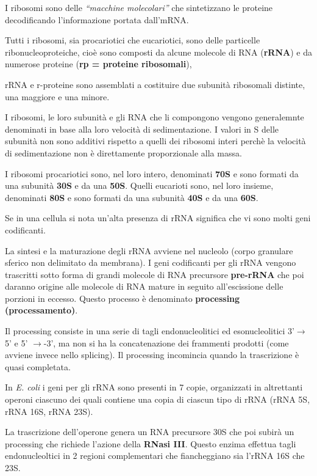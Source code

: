 \documentclass[]{article}
\begin{document}
I ribosomi sono delle \emph{``macchine molecolari''} che sintetizzano le
proteine decodificando l'informazione portata dall'mRNA.

Tutti i ribosomi, sia procariotici che eucariotici, sono delle
particelle ribonucleoproteiche, cioè sono composti da alcune molecole di
RNA (\textbf{rRNA}) e da numerose proteine (\textbf{rp = proteine
ribosomali}),

rRNA e r-proteine sono assemblati a costituire due subunità ribosomali
distinte, una maggiore e una minore.

I ribosomi, le loro subunità e gli RNA che li compongono vengono
generalemnte denominati in base alla loro velocità di sedimentazione. I
valori in S delle subunità non sono additivi rispetto a quelli dei
ribosomi interi perchè la velocità di sedimentazione non è direttamente
proporzionale alla massa.

I ribosomi procariotici sono, nel loro intero, denominati \textbf{70S} e
sono formati da una subunità \textbf{30S} e da una \textbf{50S}. Quelli
eucarioti sono, nel loro insieme, denominati \textbf{80S} e sono formati
da una subunità \textbf{40S} e da una \textbf{60S}.

Se in una cellula si nota un'alta presenza di rRNA significa che vi sono
molti geni codificanti.

La sintesi e la maturazione degli rRNA avviene nel nucleolo (corpo
granulare sferico non delimitato da membrana). I geni codificanti per
gli rRNA vengono trascritti sotto forma di grandi molecole di RNA
precursore \textbf{pre-rRNA} che poi daranno origine alle molecole di
RNA mature in seguito all'escissione delle porzioni in eccesso. Questo
processo è denominato \textbf{processing (processamento)}.

Il processing consiste in una serie di tagli endonucleolitici ed
esonucleolitici 3'\(\rightarrow\) 5' e 5' \(\rightarrow\)-3', ma non si
ha la concatenazione dei frammenti prodotti (come avviene invece nello
splicing). Il processing incomincia quando la trascrizione è quasi
completata.

In \emph{E. coli} i geni per gli rRNA sono presenti in 7 copie,
organizzati in altrettanti operoni ciascuno dei quali contiene una copia
di ciascun tipo di rRNA (rRNA 5S, rRNA 16S, rRNA 23S).

La trascrizione dell'operone genera un RNA precursore 30S che poi subirà
un processing che richiede l'azione della \textbf{RNasi III}. Questo
enzima effettua tagli endonucleoltici in 2 regioni complementari che
fiancheggiano sia l'rRNA 16S che 23S.
\end{document}
